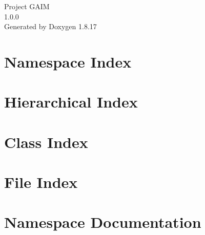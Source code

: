 \let\mypdfximage\pdfximage\def\pdfximage{\immediate\mypdfximage}\documentclass[twoside]{book}
\newcommand{\+}{\discretionary{\mbox{\scriptsize$\hookleftarrow$}}{}{}}
\newcommand{\clearemptydoublepage}{%
  \newpage{\pagestyle{empty}\cleardoublepage}%
}
\begin{document}
\begin{titlepage}
\vspace*{7cm}
\begin{center}%
{\Large Project G\+A\+IM \\[1ex]\large 1.\+0.\+0 }\\
\vspace*{1cm}
{\large Generated by Doxygen 1.8.17}\\
\end{center}
\end{titlepage}
\clearemptydoublepage
{}
\tableofcontents
\clearemptydoublepage
{}

\chapter{Namespace Index}

\chapter{Hierarchical Index}

\chapter{Class Index}

\chapter{File Index}

\chapter{Namespace Documentation}



\end{document}
